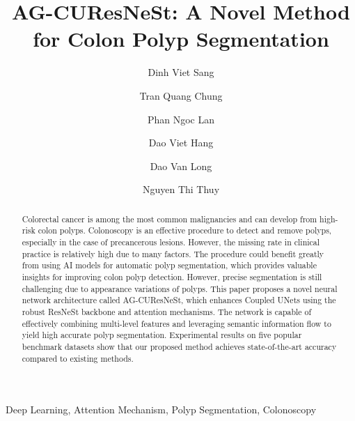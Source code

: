 \documentclass[review, sort&compress]{elsarticle}
\begin{document}
\begin{frontmatter}

\title{AG-CUResNeSt: A Novel Method for Colon Polyp Segmentation}

\author[dvs]{Dinh Viet Sang}

\author[dvs]{Tran Quang Chung}

\author[dvs]{Phan Ngoc Lan}

\author[2,3]{Dao Viet Hang}

\author[2,3]{Dao Van Long}

\author[4]{Nguyen Thi Thuy}

\address[dvs]{Hanoi University of Science and Technology, Hanoi, Vietnam}
\address[2]{Hanoi Medical University, Hanoi, Vietnam}
\address[3]{The Institute of Gastroenterology and Hepatology, Hanoi, Vietnam}
\address[4]{Faculty of Information Technology, Vietnam National University of Agriculture, Hanoi, Vietnam}






\newcommand*{\DrawBoundingBox}[1][]{\draw [red, very thick, #1]
([shift={(-0pt,-0pt)}]current bounding box.south west)
rectangle
([shift={(0pt,+0pt)}]current bounding box.north east);
}


\begin{abstract}
Colorectal cancer is among the most common malignancies and can develop from high-risk colon polyps. Colonoscopy is an effective procedure to detect and remove polyps, especially in the case of precancerous lesions. However, the missing rate in clinical practice is relatively high due to many factors. The procedure could benefit greatly from using AI models for automatic polyp segmentation, which provides valuable insights for improving colon polyp detection. However, precise segmentation is still challenging due to appearance variations of polyps. This paper proposes a novel neural network architecture called AG-CUResNeSt, which enhances Coupled UNets using the robust ResNeSt backbone and attention mechanisms. The network is capable of effectively combining multi-level features and leveraging semantic information flow to yield high accurate polyp segmentation. Experimental results on five popular benchmark datasets show that our proposed method achieves state-of-the-art accuracy compared to existing methods.
\end{abstract}

\begin{keyword}
Deep Learning, Attention Mechanism, Polyp Segmentation, Colonoscopy
\end{keyword}

\end{frontmatter}
\end{document}
